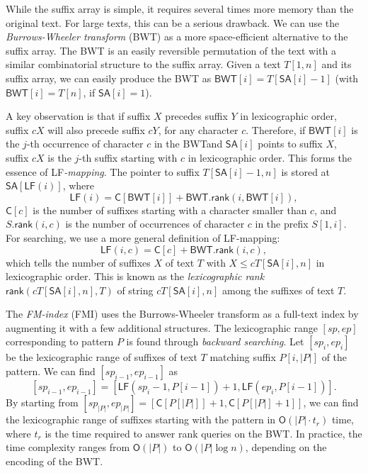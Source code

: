 \documentclass[smallabstract,smallcaptions]{dccpaper}
\newcommand{\abs}[1]{\ensuremath{\lvert #1 \rvert}}
\newcommand{\Oh}{\ensuremath{\mathsf{O}}}
\newcommand{\BWT}{\textsf{BWT}}
\newcommand{\FMI}{\textsf{FMI}}
\newcommand{\mSA}{\ensuremath{\mathsf{SA}}}
\newcommand{\mBWT}{\ensuremath{\mathsf{BWT}}}
\newcommand{\mC}{\ensuremath{\mathsf{C}}}
\newcommand{\LF}{\textsf{LF}}
\newcommand{\rank}{\textsf{rank}}
\newcommand{\mLF}{\ensuremath{\mathsf{LF}}}
\newcommand{\mrank}{\ensuremath{\mathsf{rank}}}
\begin{document}
While the suffix array is simple, it requires several times more memory than the original text. For large texts, this can be a serious drawback. We can use the \emph{Burrows-Wheeler transform} (\BWT) \cite{Burrows1994} as a more space-efficient alternative to the suffix array. The \BWT{} is an easily reversible permutation of the text with a similar combinatorial structure to the suffix array. Given a text $T[1,n]$ and its suffix array, we can easily produce the \BWT{} as $\mBWT[i] = T[\mSA[i]-1]$ (with $\mBWT[i] = T[n]$, if $\mSA[i] = 1$).

A key observation is that if suffix $X$ precedes suffix $Y$ in lexicographic order, suffix $cX$ will also precede suffix $cY$, for any character $c$. Therefore, if $\mBWT[i]$ is the $j$\nobreakdash-th occurrence of character $c$ in the \BWT and $\mSA[i]$ points to suffix $X$, suffix $cX$ is the $j$\nobreakdash-th suffix starting with $c$ in lexicographic order. This forms the essence of \LF\emph{\nobreakdash-mapping}. The pointer to suffix $T[\mSA[i]-1,n]$ is stored at $\mSA[\mLF(i)]$, where
$$
\mLF(i) = \mC[\mBWT[i]] + \mBWT.\mrank(i, \mBWT[i]),
$$
$\mC[c]$ is the number of suffixes starting with a character smaller than $c$, and $S.\mrank(i,c)$ is the number of occurrences of character $c$ in the prefix $S[1,i]$. For searching, we use a more general definition of \LF\nobreakdash-mapping:
$$
\mLF(i,c) = \mC[c] + \mBWT.\mrank(i, c),
$$
which tells the number of suffixes $X$ of text $T$ with $X \le c T[\mSA[i],n]$ in lexicographic order. This is known as the \emph{lexicographic rank} $\mrank(cT[\mSA[i],n], T)$ of string $cT[\mSA[i],n]$ among the suffixes of text $T$.

The \emph{FM-index} (\FMI) \cite{Ferragina2005a} uses the Burrows-Wheeler transform as a full-text index by augmenting it with a few additional structures. The lexicographic range $[sp,ep]$ corresponding to pattern $P$ is found through \emph{backward searching}. Let $[sp_{i},ep_{i}]$ be the lexicographic range of suffixes of text $T$ matching suffix $P[i, \abs{P}]$ of the pattern. We can find $[sp_{i-1},ep_{i-1}]$ as
$$
[sp_{i-1},ep_{i-1}] = [\mLF(sp_{i}-1, P[i-1]) + 1, \mLF(ep_{i}, P[i-1])].
$$
By starting from $[sp_{\abs{P}}, ep_{\abs{P}}] = [\mC[P[\abs{P}]]+1, \mC[P[\abs{P}]+1]]$, we can find the lexicographic range of suffixes starting with the pattern in $\Oh(\abs{P} \cdot t_{r})$ time, where $t_{r}$ is the time required to answer \rank{} queries on the \BWT. In practice, the time complexity ranges from $\Oh(\abs{P})$ to $\Oh(\abs{P} \log n)$, depending on the encoding of the \BWT{}.
\end{document}

